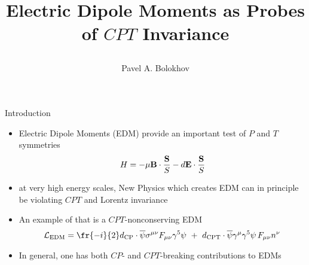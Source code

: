 \documentclass[pdf,SantaFe05talk,slideColor,colorBG,accumulate]{prosper}
\title{
\vspace{-1.0cm}
\begin{center}
\end{center}
\Huge\lbrown Electric Dipole Moments as Probes of $CPT$ Invariance\\
}
\author{
\vspace{1.4cm}
\brown Pavel A. Bolokhov}
\newcommand{\ov}{\overline}
\begin{document}
\maketitle

\begin{slide}[Glitter]{Introduction}

\begin{itemize}
\item
	Electric Dipole Moments (EDM) provide an important
	test of $P$ and $T$ symmetries
{
\mathcolor 
\[
	H = - \mu {\bf B} \cdot \frac{\bf{S}}{S} 
	    - d {\bf E} \cdot \frac{\bf{S}}{S}
\]
}
\vspace{-0.5cm}
\item
	at very high energy scales, New Physics which creates 
	EDM can in principle be violating $ CPT $ and Lorentz
	invariance
\item  
	An example of that is a $CPT$-nonconserving EDM 
{
\mathcolor
\[
	{\cal L}_{\rm EDM} = 
	\fr{-i}{2}d_{\rm CP} \cdot \ov{\psi} \sigma^{\mu\nu}
	F_{\mu\nu} \gamma^5 \psi 
	~+~ d_{\rm CPT} \cdot \ov{\psi} \gamma^\mu\gamma^5 \psi\, F_{\mu\nu}n^{\nu}
\]
}
\vspace{-0.5cm}
\item
	In general, one has both $CP$- and $CPT$-breaking contributions
	to EDMs

\end{itemize}	

\end{slide}
\end{document}
